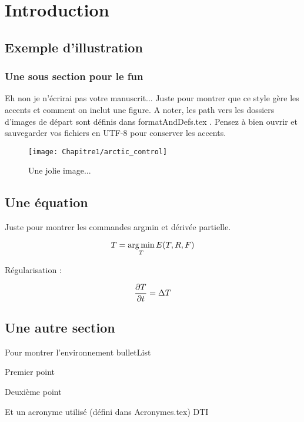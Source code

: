 
\chapter{Introduction}
\label{chap:intro}
\minitoc

\section{Exemple d'illustration}

\subsection{Une sous section pour le fun}

Eh non je n'écrirai pas votre manuscrit... Juste pour montrer que ce style gère les accents et comment on inclut une figure. A noter, les path vers les dossiers d'images de départ sont définis dans formatAndDefs.tex . Pensez à bien ouvrir et sauvegarder vos fichiers en UTF-8 pour conserver les accents.

\begin{figure}[!htbp]
  \begin{center}
    \texttt{[image: Chapitre1/arctic\_control]}
  \end{center}
  \caption{Une jolie image...}
  \label{fig:jolieImage}
\end{figure}

\section{Une équation}

Juste pour montrer les commandes argmin et dérivée partielle.

\begin{equation}
  T = \argmin_T E(T,R,F)
\end{equation}

Régularisation :

\begin{equation}
  \frac{\partial T}{\partial t} = \Delta T
\end{equation}

\section{Une autre section}

Pour montrer l'environnement bulletList

\begin{bulletList}
 \item Premier point
 \item Deuxième point
 \item Et un acronyme utilisé (défini dans Acronymes.tex) \ac{DTI}
\end{bulletList}
